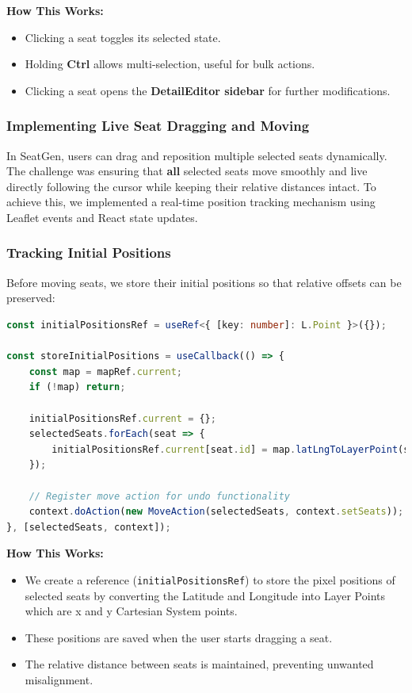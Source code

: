 \textbf{How This Works:}
\begin{itemize}
    \item Clicking a seat toggles its selected state.
    \item Holding \textbf{Ctrl} allows multi-selection, useful for bulk actions.
    \item Clicking a seat opens the \textbf{DetailEditor sidebar} for further modifications.
\end{itemize}


\subsubsection{Implementing Live Seat Dragging and Moving}

In SeatGen, users can drag and reposition multiple selected seats dynamically. The challenge was ensuring that \textbf{all} selected seats move smoothly and live directly following the cursor while keeping their relative distances intact. To achieve this, we implemented a real-time position tracking mechanism using Leaflet events and React state updates.

\subsubsection{Tracking Initial Positions}
Before moving seats, we store their initial positions so that relative offsets can be preserved:

\begin{lstlisting}[language=TypeScript, caption=Storing Initial Positions Before Dragging, label=lst:seat-initial-pos]
const initialPositionsRef = useRef<{ [key: number]: L.Point }>({});

const storeInitialPositions = useCallback(() => {
    const map = mapRef.current;
    if (!map) return;

    initialPositionsRef.current = {};
    selectedSeats.forEach(seat => {
        initialPositionsRef.current[seat.id] = map.latLngToLayerPoint(seat.position);
    });

    // Register move action for undo functionality
    context.doAction(new MoveAction(selectedSeats, context.setSeats));
}, [selectedSeats, context]);
\end{lstlisting}

\textbf{How This Works:}
\begin{itemize}
    \item We create a reference (\texttt{initialPositionsRef}) to store the pixel positions of selected seats by converting the Latitude and Longitude into Layer Points which are x and y Cartesian System points.
    \item These positions are saved when the user starts dragging a seat.
    \item The relative distance between seats is maintained, preventing unwanted misalignment.
\end{itemize}

